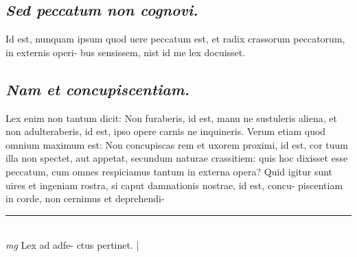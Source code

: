 \documentclass{article}
\begin{document}
\begin{pages}
\subsection*{\textit{Sed peccatum non cognovi. }}\pstart Id est, nunquam ipsum quod uere peccatum est, et radix crassorum peccatorum, in externis operi- bus sensissem, nist id me lex docuisset.   \pend
{}
{}
\subsection*{\textit{Nam et concupiscentiam. }}\pstart Lex enim non tantum dicit: Non furaberis, id est, manu ne sustuleris aliena, et non adulteraberis, id est, ipso opere carnis ne inquineris. Verum etiam quod omnium maximum est: Non concupiscas rem et uxorem proximi, id est, cor tuum illa non spectet, aut appetat, secundum naturae crassitiem: quis hoc dixisset esse peccatum, cum omnes respiciamus tantum in externa opera? Quid igitur sunt uires et ingeniam rostra, si caput damnationis nostrae, id est, concu- piscentiam in corde, non cernimus et deprehendi-  \pend
\vspace{0.5cm}\noindent
\vspace{0.2cm}\rule{1cm}{0.2pt}\\ 
\hspace{0.2cm}\textit{mg}
\footnotesize Lex ad adfe- ctus pertinet.  
\normalsize| 

\end{pages}
\end{document}
